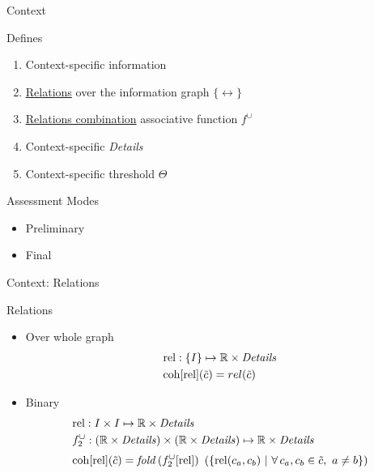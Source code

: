 \begin{frame}{Context}
  \begin{block}{Defines}
    \begin{enumerate}
      \item Context-specific information
      \item \underline{Relations} over the information graph $\{\rel\}$
      \item \underline{Relations combination} associative function $f^\cup$
      \item Context-specific \emph{Details}
      \item Context-specific threshold $\Theta$
    \end{enumerate}
  \end{block}
  \begin{block}{Assessment Modes}
    \begin{itemize}
      \item Preliminary
      \item Final
    \end{itemize}
  \end{block}
\end{frame}

\begin{frame}{Context: Relations}
  \begin{block}{Relations}
    \begin{itemize}
      \item Over whole graph
        \begin{align*}
          & \mathrm{rel}: \lbrace I \rbrace \mapsto \mathbb{R} \times \mathit{Details} \\
          & \mathrm{coh}[\mathrm{rel}](\tilde{c}) = rel(\tilde{c})
        \end{align*}
      \item Binary
        \begin{align*}
          & \mathrm{rel}: I \times I \mapsto \mathbb{R} \times \mathit{Details} \\
          & f^\cup_2: (\mathbb{R} \times \mathit{Details}) \times
                      (\mathbb{R} \times \mathit{Details})
               \mapsto \mathbb{R} \times \mathit{Details} \\[0.3em]
          & \mathrm{coh}[\mathrm{rel}](\tilde{c}) = \mathit{fold}\, (f^\cup_2[\mathrm{rel}]) ~
              \left(\lbrace \mathrm{rel}(c_a,c_b) ~|~ \forall\, c_a,c_b \in \tilde{c}
                                      , ~ a \not= b \rbrace\right)
        \end{align*}
    \end{itemize}
  \end{block}
\end{frame}

